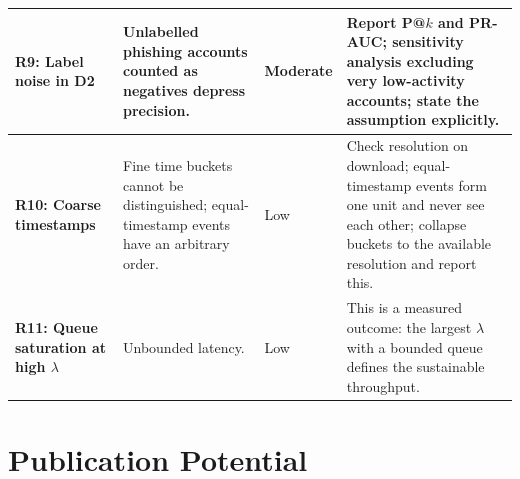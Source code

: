 \documentclass[11pt,a4paper]{article}
\begin{document}
\begin{table}[htbp]
\begin{tabularx}{\textwidth}{L{2.6cm} L{3.4cm} L{1.4cm} X}
\midrule
\textbf{R9: Label noise in D2} & Unlabelled phishing accounts counted as negatives depress precision. & Moderate & Report P@$k$ and PR-AUC; sensitivity analysis excluding very low-activity accounts; state the assumption explicitly. \\
\midrule
\textbf{R10: Coarse timestamps} & Fine time buckets cannot be distinguished; equal-timestamp events have an arbitrary order. & Low & Check resolution on download; equal-timestamp events form one unit and never see each other; collapse buckets to the available resolution and report this. \\
\midrule
\textbf{R11: Queue saturation at high $\lambda$} & Unbounded latency. & Low & This is a measured outcome: the largest $\lambda$ with a bounded queue defines the sustainable throughput. \\
\bottomrule
\end{tabularx}
\end{table}

\section{Publication Potential}
\label{sec:publication_potential}
\end{document}
